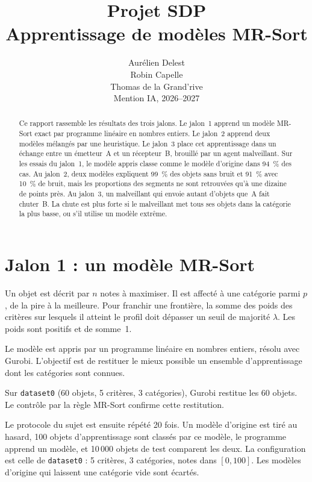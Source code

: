 \documentclass[11pt,a4paper]{article}
\title{Projet SDP\\Apprentissage de modèles MR-Sort}
\author{%
Aurélien Delest\\
Robin Capelle\\
Thomas de la Grand'rive\\[0.8em]
Mention IA, 2026--2027}
\date{}
\begin{document}
\maketitle

\begin{abstract}
\noindent
Ce rapport rassemble les résultats des trois jalons. Le jalon~1 apprend un modèle MR-Sort exact par programme linéaire en nombres entiers. Le jalon~2 apprend deux modèles mélangés par une heuristique. Le jalon~3 place cet apprentissage dans un échange entre un émetteur~A et un récepteur~B, brouillé par un agent malveillant. Sur les essais du jalon~1, le modèle appris classe comme le modèle d'origine dans 94~\% des cas. Au jalon~2, deux modèles expliquent 99~\% des objets sans bruit et 91~\% avec 10~\% de bruit, mais les proportions des segments ne sont retrouvées qu'à une dizaine de points près. Au jalon~3, un malveillant qui envoie autant d'objets que~A fait chuter~B. La chute est plus forte si le malveillant met tous ses objets dans la catégorie la plus basse, ou s'il utilise un modèle extrême.
\end{abstract}

\section{Jalon 1 : un modèle MR-Sort}

Un objet est décrit par $n$ notes à maximiser. Il est affecté à une catégorie parmi $p$, de la pire à la meilleure. Pour franchir une frontière, la somme des poids des critères sur lesquels il atteint le profil doit dépasser un seuil de majorité $\lambda$. Les poids sont positifs et de somme~1.

Le modèle est appris par un programme linéaire en nombres entiers, résolu avec Gurobi. L'objectif est de restituer le mieux possible un ensemble d'apprentissage dont les catégories sont connues.

Sur \texttt{dataset0} (60 objets, 5 critères, 3 catégories), Gurobi restitue les 60 objets. Le contrôle par la règle MR-Sort confirme cette restitution.

Le protocole du sujet est ensuite répété 20 fois. Un modèle d'origine est tiré au hasard, 100 objets d'apprentissage sont classés par ce modèle, le programme apprend un modèle, et 10\,000 objets de test comparent les deux. La configuration est celle de \texttt{dataset0} : 5 critères, 3 catégories, notes dans $[0,100]$. Les modèles d'origine qui laissent une catégorie vide sont écartés.
\end{document}
